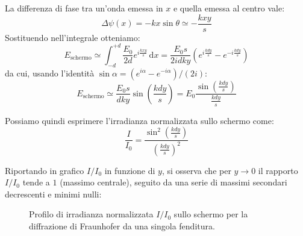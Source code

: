 \documentclass[openany,a4paper,12pt]{book}
\begin{document}
La differenza di fase tra un'onda emessa in $x$ e quella emessa al centro vale:
\begin{equation}
    \Delta\psi(x) = -k x \sin\theta \simeq -\frac{k x y}{s}
\end{equation}
Sostituendo nell'integrale otteniamo:
\begin{equation}
    E_{\text{schermo}} \simeq \int_{-d}^{+d} \frac{E_0}{2d} e^{i \frac{k x y}{s}} \,\mathrm{d}x = \frac{E_0 s}{2 i d k y} \left(e^{i \frac{k d y}{s}} - e^{-i \frac{k d y}{s}}\right)
\end{equation}
da cui, usando l'identità $\sin\alpha = (e^{i\alpha} - e^{-i\alpha})/(2i)$:
\begin{equation}
    E_{\text{schermo}} \simeq \frac{E_0 s}{d k y} \sin\left(\frac{k d y}{s}\right) = E_0 \frac{\sin\left(\frac{k d y}{s}\right)}{\frac{k d y}{s}}
\end{equation}

Possiamo quindi esprimere l'irradianza normalizzata sullo schermo come:
\begin{equation}
    \frac{I}{I_0} = \frac{\sin^2\left(\frac{k d y}{s}\right)}{\left(\frac{k d y}{s}\right)^2}
\end{equation}

Riportando in grafico $I/I_0$ in funzione di $y$, si osserva che per $y \to 0$ il rapporto $I/I_0$ tende a $1$ (massimo centrale), seguito da una serie di massimi secondari decrescenti e minimi nulli:
\begin{figure}[H]
    \centering
    \caption{Profilo di irradianza normalizzata $I/I_0$ sullo schermo per la diffrazione di Fraunhofer da una singola fenditura.}
\end{figure}
\end{document}
